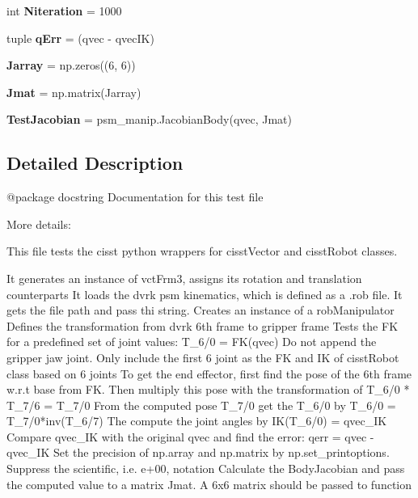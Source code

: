 \begin{DoxyCompactItemize}
\item 
int {\bfseries Niteration} = 1000\hypertarget{namespacecisstPythonTest__org_ab920079a29604681befab420c8f4aa36}{}\label{namespacecisstPythonTest__org_ab920079a29604681befab420c8f4aa36}

\item 
tuple {\bfseries q\+Err} = (qvec -\/ qvec\+IK)\hypertarget{namespacecisstPythonTest__org_a27d56813506e4fe582a669f535e4d1e1}{}\label{namespacecisstPythonTest__org_a27d56813506e4fe582a669f535e4d1e1}

\item 
{\bfseries Jarray} = np.\+zeros((6, 6))\hypertarget{namespacecisstPythonTest__org_a882eb12369b4c5936282e70d7a1afd5b}{}\label{namespacecisstPythonTest__org_a882eb12369b4c5936282e70d7a1afd5b}

\item 
{\bfseries Jmat} = np.\+matrix(Jarray)\hypertarget{namespacecisstPythonTest__org_a369df3538337149ca7200e076cb9e698}{}\label{namespacecisstPythonTest__org_a369df3538337149ca7200e076cb9e698}

\item 
{\bfseries Test\+Jacobian} = psm\+\_\+manip.\+Jacobian\+Body(qvec, Jmat)\hypertarget{namespacecisstPythonTest__org_ab2dba5d5b236e614a27c14250b303603}{}\label{namespacecisstPythonTest__org_ab2dba5d5b236e614a27c14250b303603}

\end{DoxyCompactItemize}


\subsection{Detailed Description}
\begin{DoxyVerb}@package docstring
Documentation for this test file

More details:

This file tests the cisst python wrappers for cisstVector and cisstRobot classes.

It generates an instance of vctFrm3, assigns its rotation and translation counterparts
It loads the dvrk psm kinematics, which is defined as a .rob file. It gets the file path and pass thi string.
Creates an instance of a robManipulator
Defines the transformation from dvrk 6th frame to gripper frame
Tests the FK for a predefined set of joint values: T_6/0 = FK(qvec)
Do not append the gripper jaw joint. Only include the first 6 joint as the FK and IK of cisstRobot class based on 6 joints
To get the end effector, first find the pose of the 6th frame w.r.t base from FK. Then multiply this pose with the transformation of T_6/0 * T_7/6 = T_7/0
From the computed pose T_7/0 get the T_6/0 by T_6/0 = T_7/0*inv(T_6/7)
The compute the joint angles by IK(T_6/0) = qvec_IK
Compare qvec_IK with the original qvec and find the error: qerr = qvec - qvec_IK
Set the precision of np.array and np.matrix by np.set_printoptions. Suppress the scientific, i.e. e+00, notation
Calculate the BodyJacobian and pass the computed value to a matrix Jmat. A 6x6 matrix should be passed to function\end{DoxyVerb}
 

